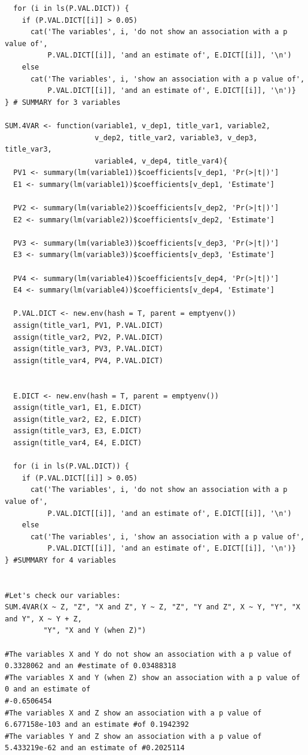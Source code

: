 \documentclass{article}
\begin{document}
\begin{lstlisting}
  for (i in ls(P.VAL.DICT)) {
    if (P.VAL.DICT[[i]] > 0.05)
      cat('The variables', i, 'do not show an association with a p value of',  
          P.VAL.DICT[[i]], 'and an estimate of', E.DICT[[i]], '\n')
    else
      cat('The variables', i, 'show an association with a p value of',  
          P.VAL.DICT[[i]], 'and an estimate of', E.DICT[[i]], '\n')}
} # SUMMARY for 3 variables

SUM.4VAR <- function(variable1, v_dep1, title_var1, variable2, 
                     v_dep2, title_var2, variable3, v_dep3, title_var3, 
                     variable4, v_dep4, title_var4){
  PV1 <- summary(lm(variable1))$coefficients[v_dep1, 'Pr(>|t|)']
  E1 <- summary(lm(variable1))$coefficients[v_dep1, 'Estimate']
  
  PV2 <- summary(lm(variable2))$coefficients[v_dep2, 'Pr(>|t|)']
  E2 <- summary(lm(variable2))$coefficients[v_dep2, 'Estimate']
  
  PV3 <- summary(lm(variable3))$coefficients[v_dep3, 'Pr(>|t|)']
  E3 <- summary(lm(variable3))$coefficients[v_dep3, 'Estimate']
  
  PV4 <- summary(lm(variable4))$coefficients[v_dep4, 'Pr(>|t|)']
  E4 <- summary(lm(variable4))$coefficients[v_dep4, 'Estimate']
  
  P.VAL.DICT <- new.env(hash = T, parent = emptyenv())
  assign(title_var1, PV1, P.VAL.DICT)
  assign(title_var2, PV2, P.VAL.DICT)
  assign(title_var3, PV3, P.VAL.DICT)
  assign(title_var4, PV4, P.VAL.DICT)
  
  
  E.DICT <- new.env(hash = T, parent = emptyenv())
  assign(title_var1, E1, E.DICT)
  assign(title_var2, E2, E.DICT)
  assign(title_var3, E3, E.DICT)
  assign(title_var4, E4, E.DICT)
  
  for (i in ls(P.VAL.DICT)) {
    if (P.VAL.DICT[[i]] > 0.05)
      cat('The variables', i, 'do not show an association with a p value of',  
          P.VAL.DICT[[i]], 'and an estimate of', E.DICT[[i]], '\n')
    else
      cat('The variables', i, 'show an association with a p value of',  
          P.VAL.DICT[[i]], 'and an estimate of', E.DICT[[i]], '\n')}
} #SUMMARY for 4 variables


#Let's check our variables:
SUM.4VAR(X ~ Z, "Z", "X and Z", Y ~ Z, "Z", "Y and Z", X ~ Y, "Y", "X and Y", X ~ Y + Z, 
         "Y", "X and Y (when Z)")
         
#The variables X and Y do not show an association with a p value of 0.3328062 and an #estimate of 0.03488318 
#The variables X and Y (when Z) show an association with a p value of 0 and an estimate of 
#-0.6506454 
#The variables X and Z show an association with a p value of 6.677158e-103 and an estimate #of 0.1942392 
#The variables Y and Z show an association with a p value of 5.433219e-62 and an estimate of #0.2025114



\end{lstlisting}
\end{document}

